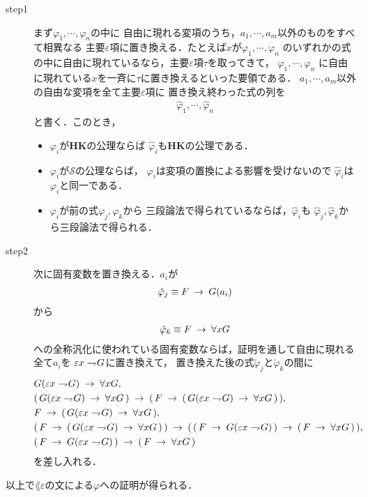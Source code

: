 	\begin{description}
		\item[step1]
			まず$\varphi_{1},\cdots,\varphi_{n}$の中に
			自由に現れる変項のうち，$a_{1},\cdots,a_{m}$以外のものをすべて相異なる
			主要$\varepsilon$項に置き換える．たとえば$x$が$\varphi_{1},\cdots,\varphi_{n}$
			のいずれかの式の中に自由に現れているなら，主要$\varepsilon$項$\tau$を取ってきて，
			$\varphi_{1},\cdots,\varphi_{n}$
			に自由に現れている$x$を一斉に$\tau$に置き換えるといった要領である．
			$a_{1},\cdots,a_{m}$以外の自由な変項を全て主要$\varepsilon$項に
			置き換え終わった式の列を
			\begin{align}
				\hat{\varphi}_{1}, \cdots, \hat{\varphi}_{n}
			\end{align}
			と書く．このとき，
			\begin{itemize}
				\item $\varphi_{i}$が{\bf HK}の公理ならば
					$\hat{\varphi}_{i}$も{\bf HK}の公理である．
				\item $\varphi_{i}$が$\mathscr{S}$の公理ならば，
					$\varphi_{i}$は変項の置換による影響を受けないので
					$\hat{\varphi}_{i}$は$\varphi_{i}$と同一である．
				\item $\varphi_{i}$が前の式$\varphi_{j},\varphi_{k}$から
					三段論法で得られているならば，$\hat{\varphi}_{i}$も
					$\hat{\varphi}_{j},\hat{\varphi}_{k}$から三段論法で得られる．
			\end{itemize}
			
		\item[step2]
			次に固有変数を置き換える．$a_{i}$が
			\begin{align}
				\hat{\varphi}_{j} \equiv F \hspace{0.25em}\rightarrow\hspace{0.25em} G(a_{i})
			\end{align}
			から
			\begin{align}
				\hat{\varphi}_{k} \equiv F \hspace{0.25em}\rightarrow\hspace{0.25em} \forall x G
			\end{align}
			への全称汎化に使われている固有変数ならば，証明を通して自由に現れる全て$a_{i}$を
			$\varepsilon x \rightharpoondown\hspace{-0.25em} G$に置き換えて，
			置き換えた後の式$\tilde{\varphi}_{j}$と$\tilde{\varphi}_{k}$の間に
			\begin{align}
				&G(\varepsilon x \rightharpoondown\hspace{-0.25em} G) \hspace{0.25em}\rightarrow\hspace{0.25em} \forall x G, \\
				&(\, G(\varepsilon x \rightharpoondown\hspace{-0.25em} G) \hspace{0.25em}\rightarrow\hspace{0.25em} \forall x G\, )
				\hspace{0.25em}\rightarrow\hspace{0.25em} (\, F \hspace{0.25em}\rightarrow\hspace{0.25em} (\, G(\varepsilon x \rightharpoondown\hspace{-0.25em} G) \hspace{0.25em}\rightarrow\hspace{0.25em} \forall x G\, )\, ), \\
				&F \hspace{0.25em}\rightarrow\hspace{0.25em} (\, G(\varepsilon x \rightharpoondown\hspace{-0.25em} G) \hspace{0.25em}\rightarrow\hspace{0.25em} \forall x G\, ), \\
				&(\, F \hspace{0.25em}\rightarrow\hspace{0.25em} (\, G(\varepsilon x \rightharpoondown\hspace{-0.25em} G) \hspace{0.25em}\rightarrow\hspace{0.25em} \forall x G\, )\, ) \hspace{0.25em}\rightarrow\hspace{0.25em}
				(\, (\, F \hspace{0.25em}\rightarrow\hspace{0.25em} G(\varepsilon x \rightharpoondown\hspace{-0.25em} G)\, ) \hspace{0.25em}\rightarrow\hspace{0.25em}
				(\, F \hspace{0.25em}\rightarrow\hspace{0.25em} \forall x G\, )\, ), \\
				&(\, F \hspace{0.25em}\rightarrow\hspace{0.25em} G(\varepsilon x \rightharpoondown\hspace{-0.25em} G)\, ) \hspace{0.25em}\rightarrow\hspace{0.25em}
				(\, F \hspace{0.25em}\rightarrow\hspace{0.25em} \forall x G\, )
			\end{align}
			を差し入れる．
	\end{description}
	以上で$\lang{\varepsilon}$の文による$\varphi$への証明が得られる．
	
